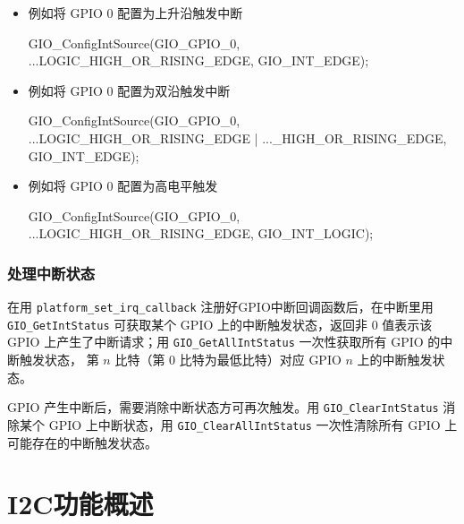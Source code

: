\documentclass[
  12pt,
]{book}
\newenvironment{Shaded}{\begin{snugshade}}{\end{snugshade}}
\newcommand{\NormalTok}[1]{#1}
\begin{document}
\begin{itemize}
\item
  例如将 GPIO 0 配置为上升沿触发中断

\begin{Shaded}
\begin{Highlighting}[]
\NormalTok{GIO_ConfigIntSource(GIO_GPIO_0,}
\NormalTok{  ...LOGIC_HIGH_OR_RISING_EDGE,}
\NormalTok{  GIO_INT_EDGE);}
\end{Highlighting}
\end{Shaded}
\item
  例如将 GPIO 0 配置为双沿触发中断

\begin{Shaded}
\begin{Highlighting}[]
\NormalTok{GIO_ConfigIntSource(GIO_GPIO_0,}
\NormalTok{  ...LOGIC_HIGH_OR_RISING_EDGE | ..._HIGH_OR_RISING_EDGE,}
\NormalTok{  GIO_INT_EDGE);}
\end{Highlighting}
\end{Shaded}
\item
  例如将 GPIO 0 配置为高电平触发

\begin{Shaded}
\begin{Highlighting}[]
\NormalTok{GIO_ConfigIntSource(GIO_GPIO_0,}
\NormalTok{  ...LOGIC_HIGH_OR_RISING_EDGE,}
\NormalTok{  GIO_INT_LOGIC);}
\end{Highlighting}
\end{Shaded}
\end{itemize}

\hypertarget{ux5904ux7406ux4e2dux65adux72b6ux6001}{%
\subsection{处理中断状态}\label{ux5904ux7406ux4e2dux65adux72b6ux6001}}

在用 \texttt{platform\_set\_irq\_callback} 注册好GPIO中断回调函数后，在中断里用 \texttt{GIO\_GetIntStatus} 可获取某个 GPIO 上的中断触发状态，返回非 0 值表示该 GPIO
上产生了中断请求；用 \texttt{GIO\_GetAllIntStatus} 一次性获取所有 GPIO 的中断触发状态，
第 \(n\) 比特（第 0 比特为最低比特）对应 GPIO \(n\) 上的中断触发状态。

GPIO 产生中断后，需要消除中断状态方可再次触发。用 \texttt{GIO\_ClearIntStatus} 消除某个 GPIO
上中断状态，用 \texttt{GIO\_ClearAllIntStatus} 一次性清除所有 GPIO 上可能存在的中断触发状态。

\hypertarget{i2cux529fux80fdux6982ux8ff0}{%
\chapter{I2C功能概述}\label{i2cux529fux80fdux6982ux8ff0}}
\end{document}
